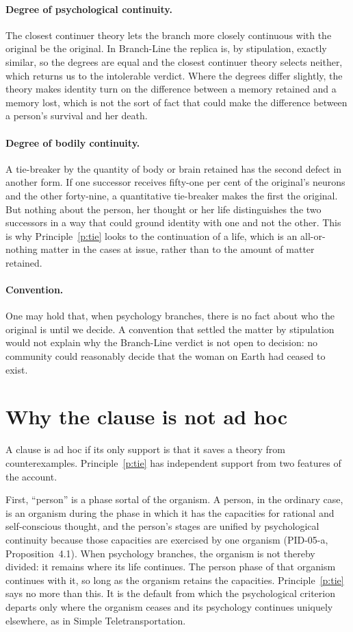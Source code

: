 \documentclass{situationist-preprint}
\begin{document}
\paragraph{Degree of psychological continuity.} The closest continuer theory \citep{Nozick1981} lets the branch more closely continuous with the original be the original. In Branch-Line the replica is, by stipulation, exactly similar, so the degrees are equal and the closest continuer theory selects neither, which returns us to the intolerable verdict. Where the degrees differ slightly, the theory makes identity turn on the difference between a memory retained and a memory lost, which is not the sort of fact that could make the difference between a person's survival and her death.

\paragraph{Degree of bodily continuity.} A tie-breaker by the quantity of body or brain retained has the second defect in another form. If one successor receives fifty-one per cent of the original's neurons and the other forty-nine, a quantitative tie-breaker makes the first the original. But nothing about the person, her thought or her life distinguishes the two successors in a way that could ground identity with one and not the other. This is why Principle~\ref{p:tie} looks to the continuation of a life, which is an all-or-nothing matter in the cases at issue, rather than to the amount of matter retained.

\paragraph{Convention.} One may hold that, when psychology branches, there is no fact about who the original is until we decide. A convention that settled the matter by stipulation would not explain why the Branch-Line verdict is not open to decision: no community could reasonably decide that the woman on Earth had ceased to exist.

\section{Why the clause is not ad hoc}

A clause is ad hoc if its only support is that it saves a theory from counterexamples. Principle~\ref{p:tie} has independent support from two features of the account.

First, \enquote{person} is a phase sortal of the organism. A person, in the ordinary case, is an organism during the phase in which it has the capacities for rational and self-conscious thought, and the person's stages are unified by psychological continuity because those capacities are exercised by one organism (PID-05-a, Proposition~4.1). When psychology branches, the organism is not thereby divided: it remains where its life continues. The person phase of that organism continues with it, so long as the organism retains the capacities. Principle~\ref{p:tie} says no more than this. It is the default from which the psychological criterion departs only where the organism ceases and its psychology continues uniquely elsewhere, as in Simple Teletransportation.
\end{document}
